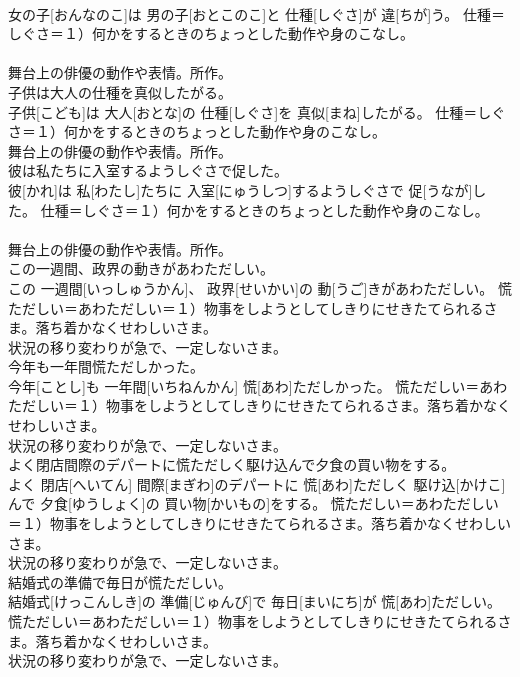 \documentclass[8pt]{extreport}
\begin{document}
\begin{CJK}{UTF8}{min}
{\\	女の子[おんなのこ]は 男の子[おとこのこ]と 仕種[しぐさ]が 違[ちが]う。	仕種＝しぐさ＝１）何かをするときのちょっとした動作や身のこなし。 　　　　　　　
\\	舞台上の俳優の動作や表情。所作。
\\	子供は大人の仕種を真似したがる。	
\\	子供[こども]は 大人[おとな]の 仕種[しぐさ]を 真似[まね]したがる。	仕種＝しぐさ＝１）何かをするときのちょっとした動作や身のこなし。 　　　　　　　
\\	舞台上の俳優の動作や表情。所作。
\\	彼は私たちに入室するようしぐさで促した。	
\\	彼[かれ]は 私[わたし]たちに 入室[にゅうしつ]するようしぐさで 促[うなが]した。	仕種＝しぐさ＝１）何かをするときのちょっとした動作や身のこなし。 　　　　　　　
\\	舞台上の俳優の動作や表情。所作。
\\	この一週間、政界の動きがあわただしい。	
\\	この 一週間[いっしゅうかん]、 政界[せいかい]の 動[うご]きがあわただしい。	慌ただしい＝あわただしい＝１）物事をしようとしてしきりにせきたてられるさま。落ち着かなくせわしいさま。 　　　　　　　　　　　　　
\\	状況の移り変わりが急で、一定しないさま。
\\	今年も一年間慌ただしかった。	
\\	今年[ことし]も 一年間[いちねんかん] 慌[あわ]ただしかった。	慌ただしい＝あわただしい＝１）物事をしようとしてしきりにせきたてられるさま。落ち着かなくせわしいさま。 　　　　　　　　　　　　　
\\	状況の移り変わりが急で、一定しないさま。
\\	よく閉店間際のデパートに慌ただしく駆け込んで夕食の買い物をする。	
\\	よく 閉店[へいてん] 間際[まぎわ]のデパートに 慌[あわ]ただしく 駆け込[かけこ]んで 夕食[ゆうしょく]の 買い物[かいもの]をする。	慌ただしい＝あわただしい＝１）物事をしようとしてしきりにせきたてられるさま。落ち着かなくせわしいさま。 　　　　　　　　　　　　　
\\	状況の移り変わりが急で、一定しないさま。
\\	結婚式の準備で毎日が慌ただしい。	
\\	結婚式[けっこんしき]の 準備[じゅんび]で 毎日[まいにち]が 慌[あわ]ただしい。	慌ただしい＝あわただしい＝１）物事をしようとしてしきりにせきたてられるさま。落ち着かなくせわしいさま。 　　　　　　　　　　　　　
\\	状況の移り変わりが急で、一定しないさま。
}
\end{CJK}
\end{document}
